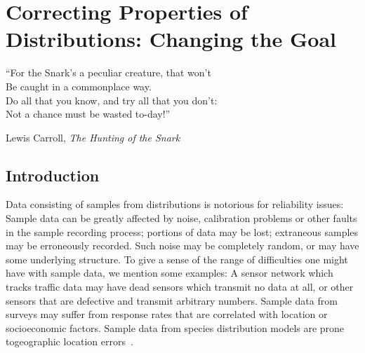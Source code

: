 \chapter{Correcting Properties of Distributions: Changing the Goal}

\epigraph{``For the Snark's a peculiar creature, that won't\\
Be caught in a commonplace way.\\
Do all that you know, and try all that you don't:\\
Not a chance must be wasted to-day!''}{Lewis Carroll, \textit{The Hunting of the Snark}}



\section{Introduction}
	
Data consisting of samples from distributions is notorious for reliability issues:  Sample data can be greatly affected by noise, calibration problems or other faults in the sample recording process;
portions of data may be lost; extraneous samples may be erroneously recorded. Such noise may be completely random, or may have some underlying structure. To give a sense
of the range of difficulties one might have with sample data, we mention some examples: A sensor network which tracks traffic data may have dead sensors  which transmit no data at all, or other sensors that are defective and transmit arbitrary numbers. Sample data
from surveys may suffer from response  rates that are correlated  with location or socioeconomic factors. Sample data from species distribution models are prone togeographic location errors~\cite{HBTB:14}.

